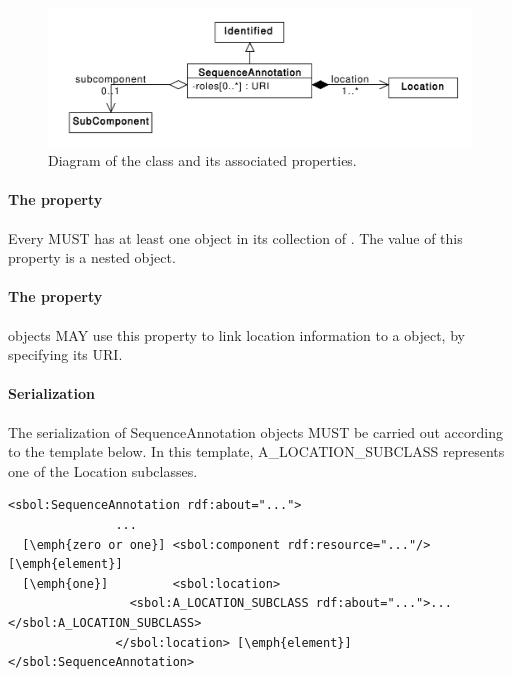 
\begin{figure}[ht]
\begin{center}
\includegraphics[scale=0.6]{uml/sequence_annotation}
\caption[]{Diagram of the  class and its associated properties.}
\label{uml:sequence_annotation}
\end{center}
\end{figure}

\paragraph{The  property}\label{sec:locations}
\label{sec:locations}
Every  MUST has at least one  object in its collection of . The value of this property is a nested  object.

\paragraph{The  property}\label{sec:component}
 objects MAY use this property to link location information to a  object, by specifying its URI.


\paragraph{Serialization}

The serialization of SequenceAnnotation objects MUST be carried out according to the template below. In this template, A\_LOCATION\_SUBCLASS represents one of the Location subclasses.
\begin{lstlisting}
<sbol:SequenceAnnotation rdf:about="...">
               ...   
  [\emph{zero or one}] <sbol:component rdf:resource="..."/> [\emph{element}] 
  [\emph{one}]         <sbol:location>
                 <sbol:A_LOCATION_SUBCLASS rdf:about="...">...</sbol:A_LOCATION_SUBCLASS>
               </sbol:location> [\emph{element}] 
</sbol:SequenceAnnotation>
\end{lstlisting}

